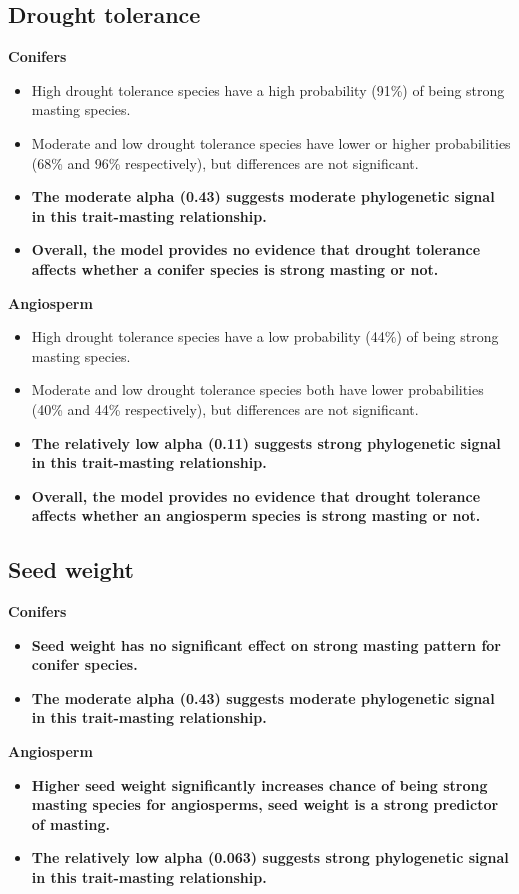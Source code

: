 \documentclass{article}
\begin{document}
\subsection{Drought tolerance}
\textbf{Conifers}\\
\begin{itemize}
\item High drought tolerance species have a high probability (91\%) of being strong masting species.
\item Moderate and low drought tolerance species have lower or higher probabilities (68\% and 96\% respectively), but differences are not significant.
\item \textbf{The moderate alpha (0.43) suggests moderate phylogenetic signal in this trait-masting relationship.}
\item \textbf{Overall, the model provides no evidence that drought tolerance affects whether a conifer species is strong masting or not.}
\end{itemize}
\textbf{Angiosperm}\\
\begin{itemize}
\item High drought tolerance species have a low probability (44\%) of being strong masting species.
\item Moderate and low drought tolerance species both have lower probabilities (40\% and 44\% respectively), but differences are not significant.
\item \textbf{The relatively low alpha (0.11) suggests strong phylogenetic signal in this trait-masting relationship.}
\item \textbf{Overall, the model provides no evidence that drought tolerance affects whether an angiosperm species is strong masting or not.}
\end{itemize}
\subsection{Seed weight}
\textbf{Conifers}\\
\begin{itemize}
\item \textbf{Seed weight has no significant effect on strong masting pattern for conifer species.}
\item \textbf{The moderate alpha (0.43) suggests moderate phylogenetic signal in this trait-masting relationship.}
\end{itemize}
\textbf{Angiosperm}\\
\begin{itemize}
\item \textbf{Higher seed weight significantly increases chance of being strong masting species for angiosperms, seed weight is a strong predictor of masting.}
\item \textbf{The relatively low alpha (0.063) suggests strong phylogenetic signal in this trait-masting relationship.}
\end{itemize}
\end{document}
